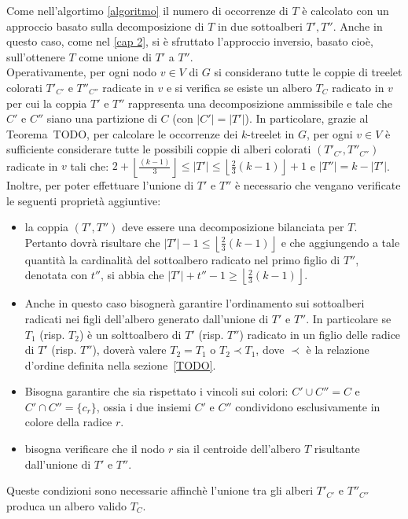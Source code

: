 Come nell'algortimo \ref{algoritmo} il numero di occorrenze di $ T $ è calcolato con un approccio basato sulla decomposizione di $T$ in due sottoalberi $T', T''$. Anche in questo caso, come nel \ref{cap 2}, si è sfruttato l'approccio inversio, basato cioè, sull'ottenere $T$ come unione di $T'$ a $T''$.\\
Operativamente, per ogni nodo $ v\in V $ di $ G $ si considerano tutte le coppie di treelet colorati $ T'_{C'} $ e $ T''_{C''} $ radicate in $ v $ e si verifica se esiste un albero $ T_C $ radicato in $ v $ per cui la coppia $ T' $ e $ T'' $ rappresenta una decomposizione ammissibile e tale che $ C' $ e $ C'' $ siano una partizione di $ C $ (con $|C'|=|T'|$). 
In particolare, grazie al Teorema~TODO, per calcolare le occorrenze dei $ k $-treelet in $ G $, per ogni $v \in V $  è sufficiente considerare tutte le possibili coppie di alberi colorati $ (T'_{C'}, T''_{C''} )$ radicate in $ v $ tali che: $ 2+ \left\lfloor \frac{(k-1)}{3}  \right\rfloor \le |T'| \le \left\lfloor \frac{2}{3}(k-1) \right\rfloor  +1 $ e $ |T''| = k-|T'| $.
Inoltre, per poter effettuare l'unione di  $T'$ e $T''$ è necessario che vengano verificate le seguenti proprietà aggiuntive: 
\begin{itemize}
	\label{prova}
	\item la coppia $ (T',T'') $ deve essere una decomposizione bilanciata per $ T $.
	Pertanto dovr\`a risultare che $ |T'| - 1 \le \left\lfloor\frac{2}{3}(k-1)\right\rfloor $ e che aggiungendo a tale quantit\`a la cardinalit\`a del sottoalbero radicato nel primo figlio di $ T'' $, denotata con $ t'' $, si abbia che $ |T'| + t'' - 1 \ge \left\lfloor\frac{2}{3}(k-1)\right\rfloor $.
	\item Anche in questo caso bisogner\`a garantire l'ordinamento sui sottoalberi radicati nei figli dell'albero generato dall'unione di $ T' $ e $ T'' $.
	In particolare se $T_1$ (risp. $T_2$) è un solttoalbero di $T'$ (risp. $T''$) radicato in un figlio delle radice di $T'$ (risp. $T''$), doverà valere $T_2 = T_1$ o $T_2 \prec T_1$, dove $\prec$ è la relazione d'ordine definita nella sezione~\ref{TODO}.  %
	\item Bisogna garantire che sia rispettato i vincoli sui colori: $C' \cup C'' = C$ e $ C' \cap C'' = \{c_r\}$, ossia i due insiemi $C'$ e $C''$ condividono esclusivamente in colore della radice $ r $.
	\item bisogna verificare che il nodo $ r $ sia il centroide dell'albero $ T $ risultante dall'unione di $ T' $ e $ T'' $. 
\end{itemize}
Queste condizioni sono necessarie affinch\`e l'unione tra gli alberi $ T'_{C'} $ e $ T''_{C''} $ produca un albero valido $ T_C $.

